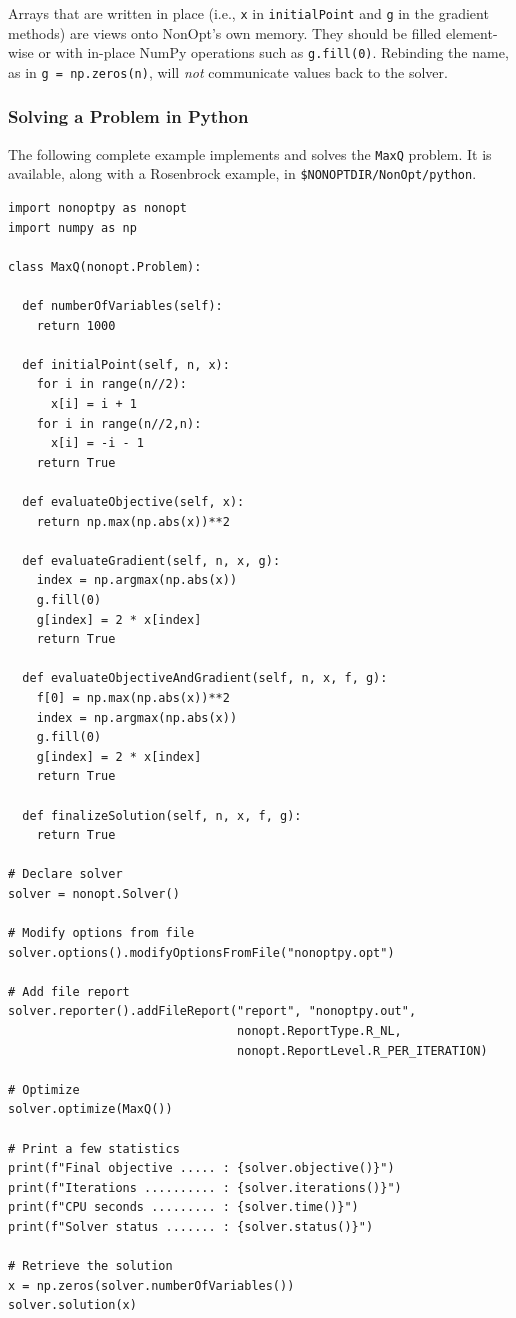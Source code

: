 \documentclass{article}
\begin{document}
Arrays that are written in place (i.e., \texttt{x} in \texttt{initialPoint} and \texttt{g} in the gradient methods) are views onto NonOpt's own memory.  They should be filled element-wise or with in-place NumPy operations such as \texttt{g.fill(0)}. Rebinding the name, as in \texttt{g = np.zeros(n)}, will \emph{not} communicate values back to the solver.

\subsubsection{Solving a Problem in Python}

The following complete example implements and solves the \texttt{MaxQ} problem.  It is available, along with a Rosenbrock example, in \texttt{\$NONOPTDIR/NonOpt/python}.

\begin{verbatim}
import nonoptpy as nonopt
import numpy as np

class MaxQ(nonopt.Problem):

  def numberOfVariables(self):
    return 1000

  def initialPoint(self, n, x):
    for i in range(n//2):
      x[i] = i + 1
    for i in range(n//2,n):
      x[i] = -i - 1
    return True

  def evaluateObjective(self, x):
    return np.max(np.abs(x))**2

  def evaluateGradient(self, n, x, g):
    index = np.argmax(np.abs(x))
    g.fill(0)
    g[index] = 2 * x[index]
    return True

  def evaluateObjectiveAndGradient(self, n, x, f, g):
    f[0] = np.max(np.abs(x))**2
    index = np.argmax(np.abs(x))
    g.fill(0)
    g[index] = 2 * x[index]
    return True

  def finalizeSolution(self, n, x, f, g):
    return True

# Declare solver
solver = nonopt.Solver()

# Modify options from file
solver.options().modifyOptionsFromFile("nonoptpy.opt")

# Add file report
solver.reporter().addFileReport("report", "nonoptpy.out",
                                nonopt.ReportType.R_NL,
                                nonopt.ReportLevel.R_PER_ITERATION)

# Optimize
solver.optimize(MaxQ())

# Print a few statistics
print(f"Final objective ..... : {solver.objective()}")
print(f"Iterations .......... : {solver.iterations()}")
print(f"CPU seconds ......... : {solver.time()}")
print(f"Solver status ....... : {solver.status()}")

# Retrieve the solution
x = np.zeros(solver.numberOfVariables())
solver.solution(x)
\end{verbatim}
\end{document}
